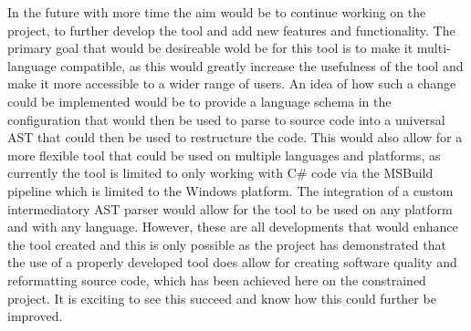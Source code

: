 In the future with more time the aim would be to continue working on the project, to further develop the tool and add new features and functionality. The primary goal that would be desireable wold be for this tool is to make it multi-language compatible, as this would greatly increase the usefulness of the tool and make it more accessible to a wider range of users. An idea of how such a change could be implemented would be to provide a language schema in the configuration that would then be used to parse to source code into a universal AST that could then be used to restructure the code. This would also allow for a more flexible tool that could be used on multiple languages and platforms, as currently the tool is limited to only working with C\# code via the MSBuild pipeline which is limited to the Windows platform. The integration of a custom intermediatory AST parser would allow for the tool to be used on any platform and with any language. However, these are all developments that would enhance the tool created and this is only possible as the project has demonstrated that the use of a properly developed tool does allow for creating software quality and reformatting source code, which has been achieved here on the constrained project. It is exciting to see this succeed and know how this could further be improved.
